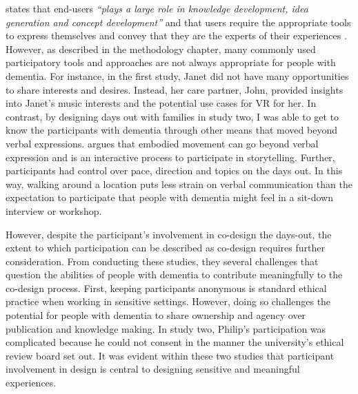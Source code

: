 \cite{sanders2008co} states that end-users \textit{``plays a large role in knowledge development, idea generation and concept development''} and that users require the appropriate tools to express themselves and convey that they are the experts of their experiences \citep{visser2005contextmapping}. However, as described in the methodology chapter, many commonly used participatory tools and approaches are not always appropriate for people with dementia. For instance, in the first study, Janet did not have many opportunities to share interests and desires. Instead, her care partner, John, provided insights into Janet's music interests and the potential use cases for VR for her. In contrast, by designing days out with families in study two, I was able to get to know the participants with dementia through other means that moved beyond verbal expressions. \cite{hyden2013storytelling} argues that embodied movement can go beyond verbal expression and is an interactive process to participate in storytelling. Further, participants had control over pace, direction and topics on the days out. In this way, walking around a location puts less strain on verbal communication than the expectation to participate that people with dementia might feel in a sit-down interview or workshop. 

However, despite the participant's involvement in co-design the days-out, the extent to which participation can be described as co-design requires further consideration. From conducting these studies, they several challenges that question the abilities of people with dementia to contribute meaningfully to the co-design process. First, keeping participants anonymous is standard ethical practice when working in sensitive settings. However, doing so challenges the potential for people with dementia to share ownership and agency over publication and knowledge making. In study two, Philip's participation was complicated because he could not consent in the manner the university's ethical review board set out. It was evident within these two studies that participant involvement in design is central to designing sensitive and meaningful experiences. 


